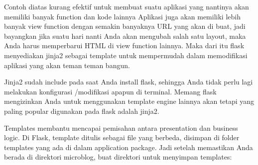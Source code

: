 Contoh diatas kurang efektif untuk membuat suatu aplikasi yang nantinya akan memiliki banyak function dan kode lainnya  Aplikasi juga akan memiliki lebih banyak view function dengan semakin banyaknya URL yang akan di buat, jadi bayangkan jika suatu hari nanti  Anda akan mengubah salah satu layout, maka  Anda harus memperbarui HTML di view function lainnya. Maka dari itu flask menyediakan jinja2 sebagai template untuk mempermudah dalam memodifikasi aplikasi yang akan teman teman bangun. 

Jinja2 sudah include pada saat  Anda install flask, sehingga  Anda tidak perlu lagi melakukan konfigurasi /modifikasi apapun di terminal. Memang flask mengizinkan  Anda untuk menggunakan template engine lainnya akan tetapi yang paling popular digunakan pada flask adalah jinja2.

Templates membantu mencapai pemisahan antara presentation dan business logic. Di Flask, template ditulis sebagai file yang berbeda, disimpan di folder templates yang ada di dalam application package. Jadi setelah memastikan  Anda berada di direktori microblog, buat direktori untuk menyimpan templates:
